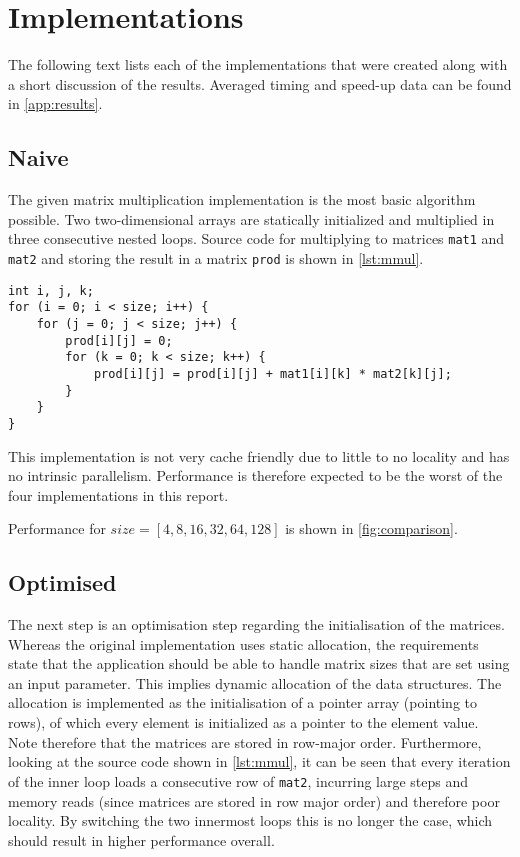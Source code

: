 \documentclass[final]{article}
\begin{document}
\section{Implementations}
\label{sec:implementations}

The following text lists each of the implementations that were created along with a short discussion of the results. Averaged timing and speed-up data can be found in \cref{app:results}.

\subsection{Naive}
The given matrix multiplication implementation is the most basic algorithm possible.
Two two-dimensional arrays are statically initialized and multiplied in three consecutive nested loops.
Source code for multiplying to matrices \texttt{mat1} and \texttt{mat2} and storing the result in a matrix \texttt{prod} is shown in \cref{lst:mmul}.

\begin{lstlisting}[style=c, caption=Basic matrix multiplication algorithm, label=lst:mmul]
int i, j, k;
for (i = 0; i < size; i++) {
	for (j = 0; j < size; j++) {
		prod[i][j] = 0;
		for (k = 0; k < size; k++) {
			prod[i][j] = prod[i][j] + mat1[i][k] * mat2[k][j];
		}
	}
}
\end{lstlisting}

This implementation is not very cache friendly due to little to no locality and has no intrinsic parallelism.
Performance is therefore expected to be the worst of the four implementations in this report.

Performance for $size = [4, 8, 16, 32, 64, 128]$ is shown in \cref{fig:comparison}.

\subsection{Optimised}
The next step is an optimisation step regarding the initialisation of the matrices.
Whereas the original implementation uses static allocation, the requirements state that the application should be able to handle matrix sizes that are set using an input parameter.
This implies dynamic allocation of the data structures.
The allocation is implemented as the initialisation of a pointer array (pointing to rows), of which every element is initialized as a pointer to the element value.
Note therefore that the matrices are stored in row-major order.
Furthermore, looking at the source code shown in \cref{lst:mmul}, it can be seen that every iteration of the inner loop loads a consecutive row of \texttt{mat2}, incurring large steps and memory reads (since matrices are stored in row major order) and therefore poor locality.
By switching the two innermost loops this is no longer the case, which should result in higher performance overall.
\end{document}
